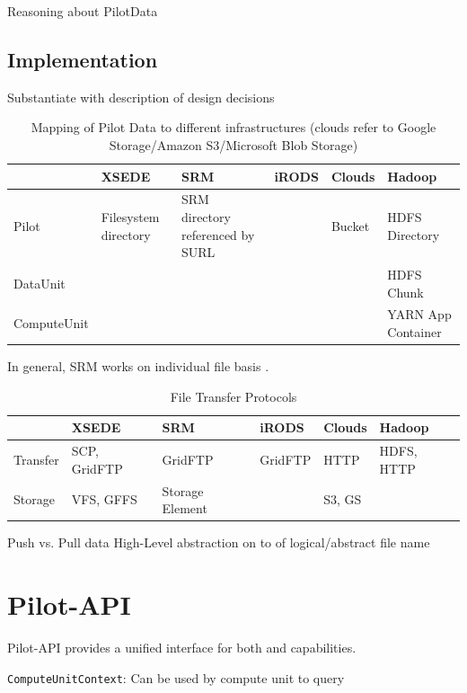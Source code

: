 \documentclass[conference]{IEEEtran}
\begin{document}
Reasoning about PilotData

\subsection{Implementation}
Substantiate with description of design decisions


\begin{table}[t]
	\centering
\begin{tabular}{|p{1.3cm}|p{1cm}|p{1cm}|p{1cm}|p{1cm}|p{1cm}|}
	\hline
	&\textbf{XSEDE} &\textbf{SRM} &\textbf{iRODS} &\textbf{Clouds} &\textbf{Hadoop}\\
	\hline
Pilot &Filesystem directory &SRM directory referenced by SURL & &Bucket&HDFS Directory\\
	\hline
DataUnit &&&&&HDFS Chunk\\
ComputeUnit &&&&&YARN App Container\\
	\hline
\end{tabular}
\caption{Mapping of Pilot Data to different infrastructures (clouds refer to Google Storage/Amazon S3/Microsoft Blob Storage)}
\end{table}

In general, SRM works on individual file basis .


\begin{table}[ht]
\begin{tabular}{|p{1cm}|p{1cm}|p{1cm}|p{1cm}|p{1cm}|p{1cm}|}
		\hline
		&\textbf{XSEDE} &\textbf{SRM} &\textbf{iRODS} &\textbf{Clouds} &\textbf{Hadoop}\\
		\hline
		Transfer &SCP, GridFTP &GridFTP &GridFTP &HTTP &HDFS, HTTP\\
		\hline
		Storage &VFS, GFFS &Storage Element & &S3, GS &\\
		\hline
\end{tabular}
\caption{File Transfer Protocols}
\end{table}

Push vs. Pull data
High-Level abstraction on to of logical/abstract file name 


\section{Pilot-API}
Pilot-API provides a unified interface for both \pilotcompute and \pilotdata 
capabilities.


\texttt{ComputeUnitContext}: Can be used by compute unit to query 
\end{document}
